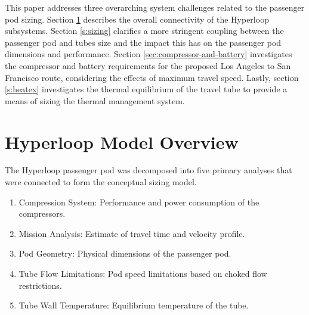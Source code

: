 \documentclass[heading.tex]{subfiles}
\begin{document}
This paper addresses three overarching system challenges related to the passenger pod sizing.
Section \ref{s:struct} describes the overall connectivity of the Hyperloop subsystems. 
Section \ref{s:sizing} clarifies a more stringent coupling between the passenger pod and tubes size
and the impact this has on the passenger pod dimensions and performance. 
Section \ref{sec:compressor-and-battery} investigates the compressor and battery requirements for the
proposed Los Angeles to San Francisco route, considering the effects of maximum travel speed. 
Lastly, section \ref{s:heatex} investigates the thermal equilibrium of the
travel tube to provide a means of sizing the thermal management system. 



\section{Hyperloop Model Overview}
\label{s:struct}

The Hyperloop passenger pod was decomposed into five primary analyses that were connected to 
form the conceptual sizing model. 

\begin{enumerate}
  \item Compression System: Performance and power consumption of the compressors.
  \item Mission Analysis: Estimate of travel time and velocity profile.
  \item Pod Geometry: Physical dimensions of the passenger pod.
  \item Tube Flow Limitations: Pod speed limitations based on choked flow restrictions.
  \item Tube Wall Temperature: Equilibrium temperature of the tube.
\end{enumerate}
\end{document}
